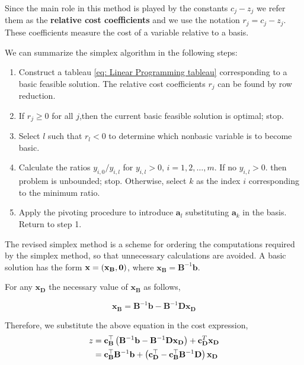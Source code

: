 Since the main role in this method is played by the constants $c_j-z_j$ we refer them as the \textbf{relative cost coefficients} and we use the notation $r_j=c_j-z_j$. These coefficients measure the cost of a variable relative to a basis.


We can summarize the simplex algorithm in the following steps:
\begin{enumerate}
	\item Construct a tableau \eqref{eq: Linear Programming tableau} corresponding to a basic feasible solution. The relative cost coefficients $r_j$ can be found by row reduction.
	\item If $r_j\geq 0$ for all $j$,then the current basic feasible solution is optimal; stop.
	\item Select $l$ such that $r_l<0$ to determine which nonbasic variable is to become basic.
	\item Calculate the ratios $y_{i,0}/y_{i,l}$ for $y_{i,l}>0$, $i=1,2,\dots, m$. If no $y_{i,l}>0$. then problem is unbounded; stop. Otherwise, select $k$ as the index $i$ corresponding to the minimum ratio. 
	\item Apply the pivoting procedure to introduce $\mathbf{a}_l$ substituting $\mathbf{a}_k$ in the basis. Return to step 1.
\end{enumerate} 

The revised simplex method is a scheme for ordering the computations required by the simplex method, so that unnecessary calculations are avoided. A basic solution has the form $\mathbf{x}=\left( \mathbf{x}_{\mathbf{B}}, \mathbf{0} \right)$, where $\mathbf{x}_\mathbf{B}=\mathbf{B}^{-1}\mathbf{b}$. 

For any $\mathbf{x}_{\mathbf{D}}$ the necessary value of $\mathbf{x}_{\mathbf{B}}$ as follows,

\begin{equation*}
	\mathbf{x}_{\mathbf{B}}=\mathbf{B}^{-1}\mathbf{b}-\mathbf{B}^{-1}\mathbf{D}\mathbf{x}_{\mathbf{D}}
\end{equation*}

Therefore, we substitute the above equation in the cost expression,
\begin{align*}
	z&=\mathbf{c}_{\mathbf{B}}^\top\left( \mathbf{B}^{-1}\mathbf{b}-\mathbf{B}^{-1}\mathbf{Dx}_{\mathbf D} \right)+\mathbf{c}_{\mathbf{D}}^T \mathbf{x}_{\mathbf D}\\
	&=\mathbf{c}_{\mathbf{B}}^\top\mathbf{B}^{-1}\mathbf{b}+\left( \mathbf{c}_{\mathbf{D}}^\top-\mathbf{c}_{\mathbf{B}}^\top\mathbf{B}^{-1}\mathbf{D} \right)\mathbf{x}_{\mathbf{D}}
\end{align*}


